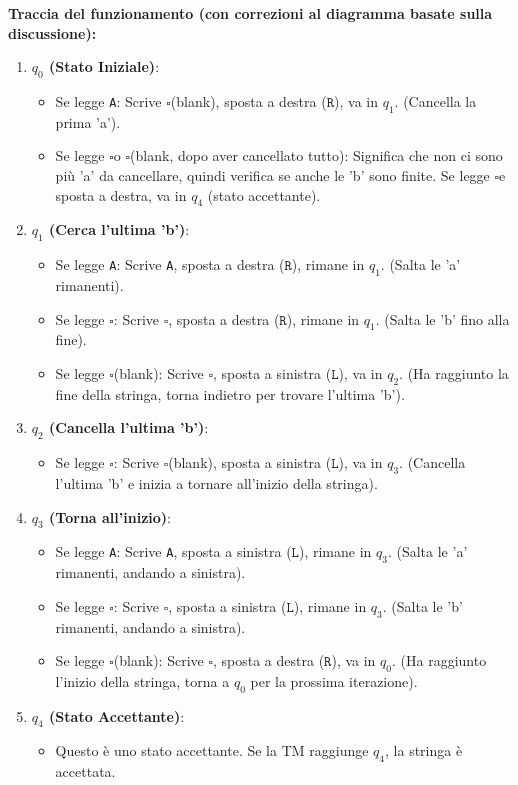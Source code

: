 \documentclass[a4paper]{article}
\theoremstyle{definition} %
\newcommand{\blankS}{\ensuremath{\square}}
\begin{document}
\textbf{Traccia del funzionamento (con correzioni al diagramma basate sulla discussione):}
\begin{enumerate}
    \item \textbf{$q_0$ (Stato Iniziale)}:
        \begin{itemize}
            \item Se legge \texttt{A}: Scrive \blankS (blank), sposta a destra ($\texttt{R}$), va in $q_1$. (Cancella la prima 'a').
            \item Se legge \blankS o \blankS (blank, dopo aver cancellato tutto): Significa che non ci sono più 'a' da cancellare, quindi verifica se anche le 'b' sono finite. Se legge \blankS e sposta a destra, va in $q_4$ (stato accettante).
        \end{itemize}
    \item \textbf{$q_1$ (Cerca l'ultima 'b')}:
        \begin{itemize}
            \item Se legge \texttt{A}: Scrive \texttt{A}, sposta a destra ($\texttt{R}$), rimane in $q_1$. (Salta le 'a' rimanenti).
            \item Se legge \blankS: Scrive \blankS, sposta a destra ($\texttt{R}$), rimane in $q_1$. (Salta le 'b' fino alla fine).
            \item Se legge \blankS (blank): Scrive \blankS, sposta a sinistra ($\texttt{L}$), va in $q_2$. (Ha raggiunto la fine della stringa, torna indietro per trovare l'ultima 'b').
        \end{itemize}
    \item \textbf{$q_2$ (Cancella l'ultima 'b')}:
        \begin{itemize}
            \item Se legge \blankS: Scrive \blankS (blank), sposta a sinistra ($\texttt{L}$), va in $q_3$. (Cancella l'ultima 'b' e inizia a tornare all'inizio della stringa).
        \end{itemize}
    \item \textbf{$q_3$ (Torna all'inizio)}:
        \begin{itemize}
            \item Se legge \texttt{A}: Scrive \texttt{A}, sposta a sinistra ($\texttt{L}$), rimane in $q_3$. (Salta le 'a' rimanenti, andando a sinistra).
            \item Se legge \blankS: Scrive \blankS, sposta a sinistra ($\texttt{L}$), rimane in $q_3$. (Salta le 'b' rimanenti, andando a sinistra).
            \item Se legge \blankS (blank): Scrive \blankS, sposta a destra ($\texttt{R}$), va in $q_0$. (Ha raggiunto l'inizio della stringa, torna a $q_0$ per la prossima iterazione).
        \end{itemize}
    \item \textbf{$q_4$ (Stato Accettante)}:
        \begin{itemize}
            \item Questo è uno stato accettante. Se la TM raggiunge $q_4$, la stringa è accettata.
        \end{itemize}
\end{enumerate}
\end{document}
